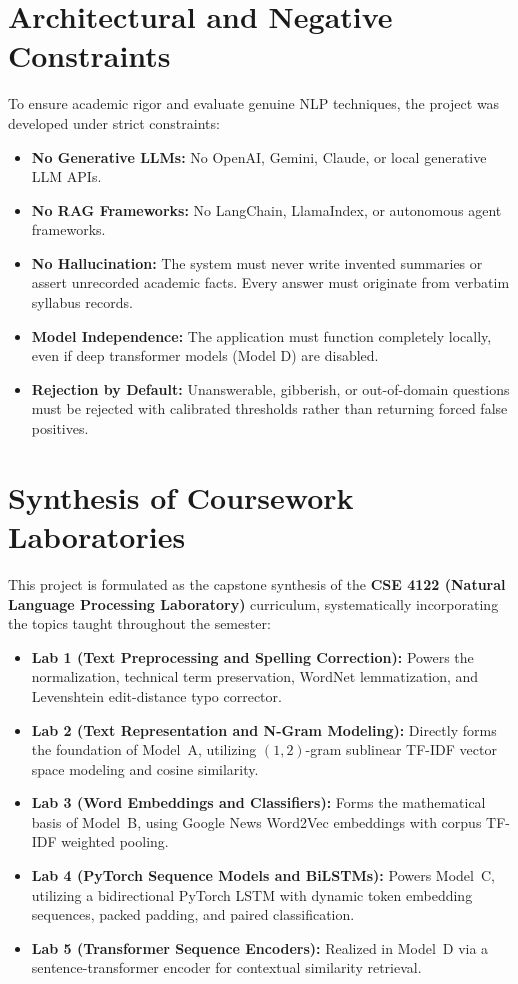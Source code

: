 \documentclass[12pt,a4paper]{report}
\begin{document}
\section{Architectural and Negative Constraints}
To ensure academic rigor and evaluate genuine NLP techniques, the project was developed under strict constraints:
\begin{itemize}
    \item \textbf{No Generative LLMs:} No OpenAI, Gemini, Claude, or local generative LLM APIs.
    \item \textbf{No RAG Frameworks:} No LangChain, LlamaIndex, or autonomous agent frameworks.
    \item \textbf{No Hallucination:} The system must never write invented summaries or assert unrecorded academic facts. Every answer must originate from verbatim syllabus records.
    \item \textbf{Model Independence:} The application must function completely locally, even if deep transformer models (Model D) are disabled.
    \item \textbf{Rejection by Default:} Unanswerable, gibberish, or out-of-domain questions must be rejected with calibrated thresholds rather than returning forced false positives.
\end{itemize}

\section{Synthesis of Coursework Laboratories}
This project is formulated as the capstone synthesis of the \textbf{CSE 4122 (Natural Language Processing Laboratory)} curriculum, systematically incorporating the topics taught throughout the semester:
\begin{itemize}
    \item \textbf{Lab 1 (Text Preprocessing and Spelling Correction):} Powers the normalization, technical term preservation, WordNet lemmatization, and Levenshtein edit-distance typo corrector.
    \item \textbf{Lab 2 (Text Representation and N-Gram Modeling):} Directly forms the foundation of Model~A, utilizing $(1, 2)$-gram sublinear TF-IDF vector space modeling and cosine similarity.
    \item \textbf{Lab 3 (Word Embeddings and Classifiers):} Forms the mathematical basis of Model~B, using Google News Word2Vec embeddings with corpus TF-IDF weighted pooling.
    \item \textbf{Lab 4 (PyTorch Sequence Models and BiLSTMs):} Powers Model~C, utilizing a bidirectional PyTorch LSTM with dynamic token embedding sequences, packed padding, and paired classification.
    \item \textbf{Lab 5 (Transformer Sequence Encoders):} Realized in Model~D via a sentence-transformer encoder for contextual similarity retrieval.
\end{itemize}
\end{document}
